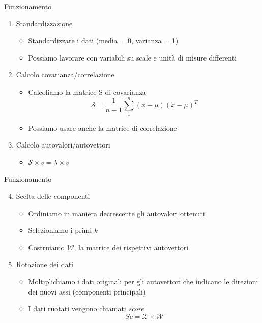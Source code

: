 \documentclass[xcolor={dvipsnames}]{beamer}
\begin{document}
		\begin{frame}{Funzionamento}
			\begin{enumerate}
				\item Standardizzazione
				\begin{itemize}
					\item Standardizzare i dati (media = 0, varianza = 1)
					\item Possiamo lavorare con variabili su scale e unità di misure differenti
				\end{itemize}
				\item Calcolo covarianza/correlazione
				\begin{itemize}
					\item Calcoliamo la matrice S di covarianza $$\mathcal{S} = \frac{1}{n-1} \sum_{1}^{n} (x-\mu)(x-\mu)^T$$
					\item Possiamo usare anche la matrice di correlazione
				\end{itemize}
				\item Calcolo autovalori/autovettori 
				\begin{itemize}
					\item $\mathcal{S} \times v = \lambda \times v$
				\end{itemize}
			\end{enumerate}
		\end{frame}

	\begin{frame}{Funzionamento}
		\begin{enumerate}
			\setcounter{enumi}{3}
			\item Scelta delle componenti
			\begin{itemize}
				\item Ordiniamo in maniera decrescente gli autovalori ottenuti
				\item Selezioniamo i primi \emph{k}
				\item Costruiamo $\mathcal{W}$, la matrice dei rispettivi autovettori
			\end{itemize}
			\item Rotazione dei dati
			\begin{itemize}
				\item Moltiplichiamo i dati originali per gli autovettori che indicano le direzioni dei nuovi assi (componenti principali) 
				\item I dati ruotati vengono chiamati \emph{score} $$Sc = \mathcal{X} \times \mathcal{W}$$
			\end{itemize}
		\end{enumerate}
	\end{frame}
\end{document}
